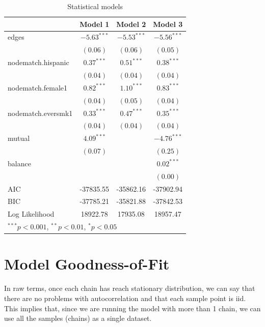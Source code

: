 \documentclass[]{book}
\theoremstyle{definition}
\theoremstyle{definition}
\theoremstyle{definition}
\theoremstyle{remark}
\begin{document}
\begin{table}
\begin{center}
\begin{tabular}{l c c c }
\hline
 & Model 1 & Model 2 & Model 3 \\
\hline
edges              & $-5.63^{***}$ & $-5.53^{***}$ & $-5.56^{***}$ \\
                   & $(0.06)$      & $(0.06)$      & $(0.05)$      \\
nodematch.hispanic & $0.37^{***}$  & $0.51^{***}$  & $0.38^{***}$  \\
                   & $(0.04)$      & $(0.04)$      & $(0.04)$      \\
nodematch.female1  & $0.82^{***}$  & $1.10^{***}$  & $0.83^{***}$  \\
                   & $(0.04)$      & $(0.05)$      & $(0.04)$      \\
nodematch.eversmk1 & $0.33^{***}$  & $0.47^{***}$  & $0.35^{***}$  \\
                   & $(0.04)$      & $(0.04)$      & $(0.04)$      \\
mutual             & $4.09^{***}$  &               & $-4.76^{***}$ \\
                   & $(0.07)$      &               & $(0.25)$      \\
balance            &               &               & $0.02^{***}$  \\
                   &               &               & $(0.00)$      \\
\hline
AIC                & -37835.55     & -35862.16     & -37902.94     \\
BIC                & -37785.21     & -35821.88     & -37842.53     \\
Log Likelihood     & 18922.78      & 17935.08      & 18957.47      \\
\hline
\multicolumn{4}{l}{\scriptsize{$^{***}p<0.001$, $^{**}p<0.01$, $^*p<0.05$}}
\end{tabular}
\caption{Statistical models}
\label{table:coefficients}
\end{center}
\end{table}

\section{Model Goodness-of-Fit}\label{model-goodness-of-fit}

In raw terms, once each chain has reach stationary distribution, we can
say that there are no problems with autocorrelation and that each sample
point is iid. This implies that, since we are running the model with
more than 1 chain, we can use all the samples (chains) as a single
dataset.
\end{document}
